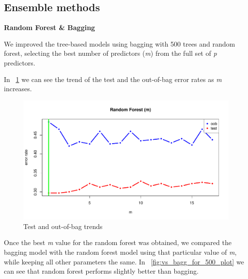 \subsection{Ensemble methods}

\vspace{0.2cm}
\noindent
\textbf{Random Forest \& Bagging}

We improved the tree-based models using bagging with 500 trees and random forest, selecting the best number of predictors (\textit{m}) from the full set of \textit{p} predictors.

In \Fig~\ref{fig:m_best_for_500_plot} we can see the trend of the test and the out-of-bag error rates as \textit{m} increases.

\begin{figure}[h]
	\centering
	\includegraphics[width=0.5\linewidth]{ImageFiles/Classification/Trees/m_best_for_500_plot}
	\caption{Test and out-of-bag trends}
	\label{fig:m_best_for_500_plot}
\end{figure}

Once the best \textit{m} value for the random forest was obtained, we compared the bagging model with the random forest model using that particular value of \textit{m}, while keeping all other parameters the same.
In \Fig~\ref{fig:vs_bagg_for_500_plot} we can see that random forest performs slightly better than bagging.

